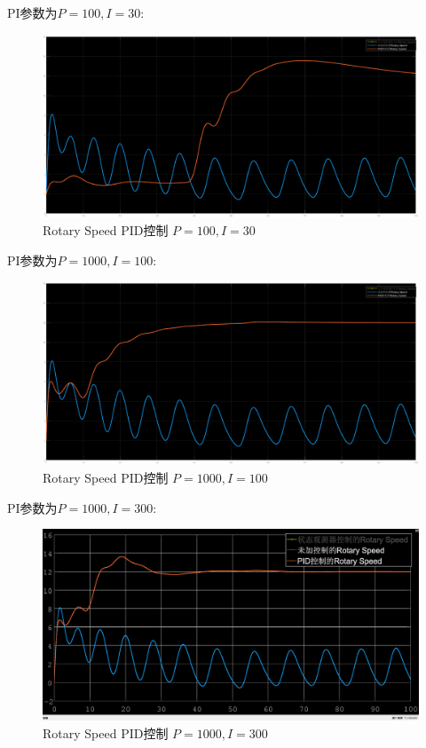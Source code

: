 \documentclass[12pt,hyperref,a4paper,UTF8]{ctexart}
\begin{document}
	
	PI参数为$P=100,I=30$:
	
	\begin{figure}[!htbp]
		\centering
		\includegraphics[width=0.7\linewidth]{figures/Rotary_Speed_PID控制_P100_I30}
		\caption{Rotary Speed PID控制 $P=100,I=30$}
		\label{fig:Rotary_Speed_PID控制_P100_I30}
	\end{figure}
	
	
	PI参数为$P=1000,I=100$:
	
	
	
	\begin{figure}[!htbp]
		\centering
		\includegraphics[width=0.7\linewidth]{figures/Rotary_Speed_PID控制_P1000_I100}
		\caption{Rotary Speed PID控制 $P=1000,I=100$}
		\label{fig:Rotary_Speed_PID控制_P1000_I100}
	\end{figure}
	
	
	PI参数为$P=1000,I=300$:
	
	
	
	\begin{figure}[!htbp]
		\centering
		\includegraphics[width=0.7\linewidth]{figures/Rotary_Speed_PID控制}
		\caption{Rotary Speed PID控制 $P=1000,I=300$}
		\label{fig:Rotary_Speed_PID控制}
	\end{figure}
	
\end{document}
